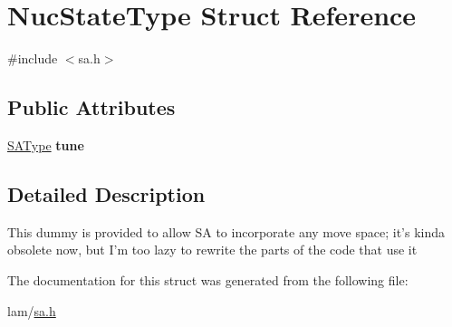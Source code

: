 \hypertarget{structNucStateType}{
\section{NucStateType Struct Reference}
\label{structNucStateType}
}


{\ttfamily \#include $<$sa.h$>$}\subsection*{Public Attributes}
\begin{DoxyCompactItemize}
\item 
\hypertarget{structNucStateType_ad4db7ce340f7e342d070d7ea2910b867}{
\hyperlink{structSAType}{SAType} {\bfseries tune}}
\label{structNucStateType_ad4db7ce340f7e342d070d7ea2910b867}

\end{DoxyCompactItemize}


\subsection{Detailed Description}
This dummy is provided to allow SA to incorporate any move space; it's kinda obsolete now, but I'm too lazy to rewrite the parts of the code that use it 

The documentation for this struct was generated from the following file:\begin{DoxyCompactItemize}
\item 
lam/\hyperlink{sa_8h}{sa.h}\end{DoxyCompactItemize}
